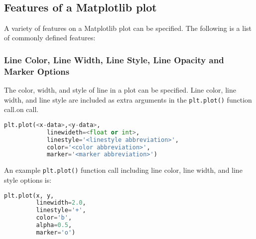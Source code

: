 \documentclass{book}
\newcommand{\passthrough}[1]{#1}
\begin{document}
    \begin{center}
    \end{center}
    { \hspace*{\fill} \\}
    

    
        \hypertarget{features-of-a-matplotlib-plot}{%
\subsection{Features of a Matplotlib
plot}\label{features-of-a-matplotlib-plot}}
    




    
        A variety of features on a Matplotlib plot can be specified. The
following is a list of commonly defined features:
    




    
        \hypertarget{line-color-line-width-line-style-line-opacity-and-marker-options}{%
\subsubsection{Line Color, Line Width, Line Style, Line Opacity and
Marker
Options}\label{line-color-line-width-line-style-line-opacity-and-marker-options}}

The color, width, and style of line in a plot can be specified. Line
color, line width, and line style are included as extra arguments in the
\passthrough{\lstinline!plt.plot()!} function call.on call.

\begin{lstlisting}[language=Python]
plt.plot(<x-data>,<y-data>,
            linewideth=<float or int>,
            linestyle='<linestyle abbreviation>',
            color='<color abbreviation>',
            marker='<marker abbreviation>')
\end{lstlisting}

An example \passthrough{\lstinline!plt.plot()!} function call including
line color, line width, and line style options is:

\begin{lstlisting}[language=Python]
plt.plot(x, y,
         linewidth=2.0,
         linestyle='+',
         color='b',
         alpha=0.5,
         marker='o')
\end{lstlisting}
\end{document}
